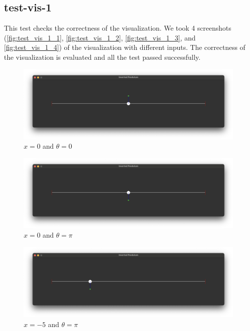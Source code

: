 \documentclass[12pt, titlepage]{article}
\begin{document}
\subsection{test-vis-1}
This test checks the correctness of the visualization. We took 4 screenshots
(\autoref{fig:test_vis_1_1}, \autoref{fig:test_vis_1_2}, \autoref{fig:test_vis_1_3}, 
and \autoref{fig:test_vis_1_4}) of the visualization with different inputs.
The correctness of the visualization is evaluated and all the test passed successfully.

\begin{figure}[h!]
  \begin{center}
    \includegraphics[width=\textwidth]{test_vis_1_1.png}
  \end{center}
  \caption{$x=0$ and $\theta=0$}
  \label{fig:test_vis_1_1}
\end{figure}

\begin{figure}[h!]
  \begin{center}
    \includegraphics[width=\textwidth]{test_vis_1_2.png}
  \end{center}
  \caption{$x=0$ and $\theta=\pi$}
  \label{fig:test_vis_1_2}
\end{figure}

\begin{figure}[h!]
  \begin{center}
    \includegraphics[width=\textwidth]{test_vis_1_3.png}
  \end{center}
  \caption{$x=-5$ and $\theta=\pi$}
  \label{fig:test_vis_1_3}
\end{figure}
\end{document}

